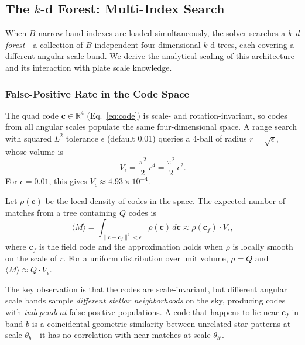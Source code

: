 \documentclass[twocolumn, 10pt]{article}
\begin{document}
\subsection{The $k$-d Forest: Multi-Index Search} \label{sec:kdforest}

When $B$ narrow-band indexes are loaded simultaneously, the solver
searches a \emph{$k$-d forest}---a collection of $B$ independent
four-dimensional $k$-d trees, each covering a different angular scale
band. We derive the analytical scaling of this architecture and its
interaction with plate scale knowledge.

\subsubsection{False-Positive Rate in the Code Space} \label{sec:fp_rate}

The quad code $\mathbf{c} \in \mathbb{R}^4$ (Eq.~\ref{eq:code}) is
scale- and rotation-invariant, so codes from all angular scales
populate the same four-dimensional space. A range search with squared
$L^2$ tolerance $\epsilon$ (default 0.01) queries a 4-ball of radius
$r = \sqrt{\epsilon}$, whose volume is
\begin{equation} \label{eq:vol}
    V_\epsilon = \frac{\pi^2}{2}\, r^4
    = \frac{\pi^2}{2}\, \epsilon^2.
\end{equation}
For $\epsilon = 0.01$, this gives $V_\epsilon \approx 4.93 \times 10^{-4}$.

Let $\rho(\mathbf{c})$ be the local density of codes in the space.
The expected number of matches from a tree containing $Q$ codes is
\begin{equation} \label{eq:matches}
    \langle M \rangle = \int_{\|\mathbf{c} - \mathbf{c}_f\|^2 < \epsilon}
    \rho(\mathbf{c})\, d\mathbf{c}
    \approx \rho(\mathbf{c}_f) \cdot V_\epsilon,
\end{equation}
where $\mathbf{c}_f$ is the field code and the approximation holds
when $\rho$ is locally smooth on the scale of $r$. For a uniform
distribution over unit volume, $\rho = Q$ and
$\langle M \rangle \approx Q \cdot V_\epsilon$.

The key observation is that the codes are scale-invariant, but different
angular scale bands sample \emph{different stellar neighborhoods} on
the sky, producing codes with \emph{independent} false-positive
populations. A code that happens to lie near $\mathbf{c}_f$ in band
$b$ is a coincidental geometric similarity between unrelated star
patterns at scale $\theta_b$---it has no correlation with near-matches
at scale $\theta_{b'}$.
\end{document}
